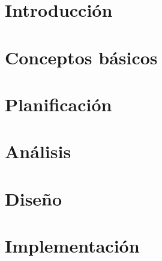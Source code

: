 \documentclass[a4paper,11pt,spanish]{book}
\begin{document}
\renewcommand{\figurename}{Figura}
\renewcommand{\listfigurename}{Índice de figuras}
\renewcommand{\tablename}{Tabla}
\renewcommand{\listtablename}{Índice de tablas}
\renewcommand{\lstlistingname}{Listado}
\renewcommand*\lstlistlistingname{Índice de listados}

\pagestyle{empty}

\cleardoublepage


\cleardoublepage
\pagestyle{plain}

\frontmatter %


\cleardoublepage

\tableofcontents
\listoffigures
\listoftables
\lstlistoflistings


\mainmatter %


\chapter{Introducción}


\chapter{Conceptos básicos}


\chapter{Planificación}


\chapter{Análisis}


\chapter{Diseño}


\chapter{Implementación}

\end{document}
